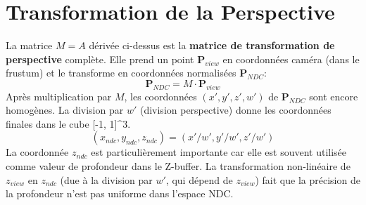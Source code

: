 \section{Transformation de la Perspective}
La matrice \( M = A \) dérivée ci-dessus est la \textbf{matrice de transformation de perspective} complète. Elle prend un point \( \mathbf{P}_{view} \) en coordonnées caméra (dans le frustum) et le transforme en coordonnées normalisées \( \mathbf{P}_{NDC} \):
\[ \mathbf{P}_{NDC} = M \cdot \mathbf{P}_{view} \]
Après multiplication par \( M \), les coordonnées \( (x', y', z', w') \) de \( \mathbf{P}_{NDC} \) sont encore homogènes. La division par \( w' \) (division perspective) donne les coordonnées finales dans le cube [-1, 1]^3.
\[ (x_{ndc}, y_{ndc}, z_{ndc}) = (x'/w', y'/w', z'/w') \]
La coordonnée \( z_{ndc} \) est particulièrement importante car elle est souvent utilisée comme valeur de profondeur dans le Z-buffer. La transformation non-linéaire de \( z_{view} \) en \( z_{ndc} \) (due à la division par \( w' \), qui dépend de \( z_{view} \)) fait que la précision de la profondeur n'est pas uniforme dans l'espace NDC.
